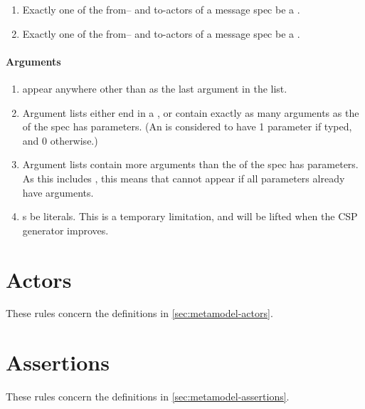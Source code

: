 \begin{enumerate}
\item
	Exactly one of the from-- and to-actors of a message spec \rfcmust{} 
	be a \mtarget.
\item
	Exactly one of the from-- and to-actors of a message spec \rfcmust{} 
	be a \mworld.
\end{enumerate}

\paragraph{Arguments}

\begin{enumerate}
\item
	\mrestargument{} \rfcmustnot{} appear anywhere other than as the last
	argument in the list.
\item
	Argument lists \rfcmust{} either end in a \mrestargument, or
	contain exactly as many arguments as the \mmessagetopic{} of the spec
	has parameters.  (An \meventtopic{} is considered to have 1 parameter
	if typed, and 0 otherwise.)
\item
	Argument lists \rfcmustnot{} contain more
	arguments than the \mmessagetopic{} of the spec has parameters.
	As this includes \mrestargument, this means that \mrestargument{} cannot
	appear if all parameters already have arguments.
\item
	\mexpressionargument s \rfcshould{} be literals.  This is a temporary
	limitation, and will be lifted when the CSP generator improves.
\end{enumerate}

\section{Actors}\label{sec:wf-actors}

These rules concern the definitions in \cref{sec:metamodel-actors}.

\section{Assertions}\label{sec:wf-assertions}

These rules concern the definitions in \cref{sec:metamodel-assertions}.

